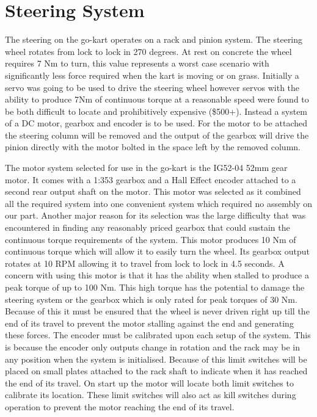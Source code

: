 \section{Steering System}

The steering on the go-kart operates on a rack and pinion system. The steering
wheel rotates from lock to lock in 270 degrees. At rest on concrete the wheel
requires 7 Nm to turn, this value represents a worst case scenario with
significantly less force required when the kart is moving or on grass. Initially
a servo was going to be used to drive the steering wheel however servos with the
ability to produce 7Nm of continuous torque at a reasonable speed were found to
be both difficult to locate and prohibitively expensive (\$500+). Instead a
system of a DC motor, gearbox and encoder is to be used. For the motor to be
attached the steering column will be removed and the output of the gearbox
will drive the pinion directly with the motor bolted in the space left by the
removed column. %

The motor system selected for use in the go-kart is the IG52-04 52mm gear motor.
It comes with a 1:353 gearbox and a Hall Effect encoder attached to a second
rear output shaft on the motor. This motor was selected as it combined all the
required system into one convenient system which required no assembly on our part.
Another major reason for its selection was the large difficulty that was
encountered in finding any reasonably priced gearbox that could sustain the
continuous torque requirements of the system. This motor produces 10 Nm of continuous torque
which will allow it to easily turn the wheel. Its gearbox output rotates at 10
RPM allowing it to travel from lock to lock in 4.5 seconds. A concern with using
this motor is that it has the ability when stalled to produce a peak torque of
up to 100 Nm. This high torque has the potential to damage the steering system
or the gearbox which is only rated for peak torques of 30 Nm. Because of this it
must be ensured that the wheel is never driven right up till the end of its
travel to prevent the motor stalling against the end and generating these
forces. The encoder must be calibrated upon each setup of the system. This is
because the encoder only outputs change in rotation and the rack may be in any
position when the system is initialised. Because of this limit switches will be
placed on small plates attached to the rack shaft to indicate when it has
reached the end of its travel. On start up the motor will locate both limit
switches to calibrate its location. These limit switches will also act as kill
switches during operation to prevent the motor reaching the end of its travel.

